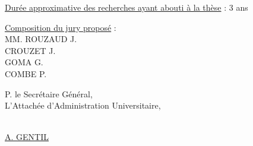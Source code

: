\uline{Durée approximative des recherches ayant abouti à la thèse} : 3 ans

\uline{Composition du jury proposé} :\\
MM. ROUZAUD J.\\
\hspace*{2em}CROUZET J.\\
\hspace*{2em}GOMA G.\\
\hspace*{2em}COMBE P.

P. le Secrétaire Général,\\
L'Attachée d'Administration Universitaire,

\uline{}\\
\uline{A. GENTIL}


